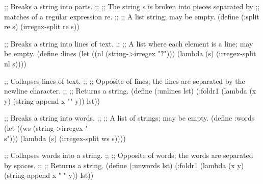 ;; Breaks a string into parts.
;;
;; The string s is broken into pieces separated by
;; matches of a regular expression re.
;;
;; A list string; may be empty. 
(define (:split re s)
  (irregex-split re s))


;; Breaks a string into lines of text.
;;
;; A list where each element is a line; may be empty. 
(define :lines
  (let ((nl (string->irregex "\r?\n")))
    (lambda (s)
      (irregex-split nl s))))


;; Collapses lines of text.
;;
;; Opposite of lines; the lines are separated by the newline character.
;;
;; Returns a string.
(define (:unlines lst)
  (:foldr1 (lambda (x y) (string-append  x "\n" y)) lst))


;; Breaks a string into words.
;;
;; A list of strings; may be empty. 
(define :words
  (let ((ws (string->irregex "\\s")))
    (lambda (s)
      (irregex-split ws s))))


;; Collapses words into a string.
;;
;; Opposite of words; the words are separated by spaces.
;;
;; Returns a string.
(define (:unwords lst)
  (:foldr1 (lambda (x y) (string-append  x " " y)) lst))
